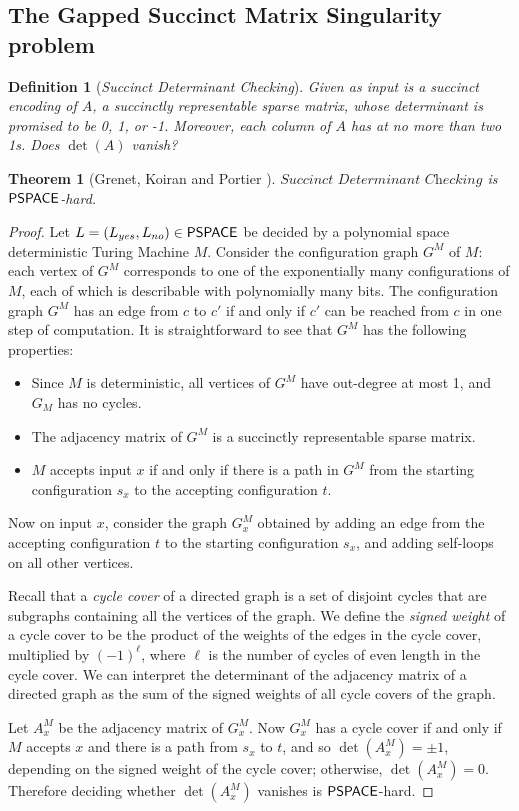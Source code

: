 \documentclass[11pt]{article}
\newtheorem{theorem}{Theorem}
\newtheorem{definition}{Definition}
\theoremstyle{definition}
\theoremstyle{remark}
\newcommand\PSPACE{{\sf{PSPACE}}}
\newcommand\succdet{\textit{Succinct Determinant Checking}}
\begin{document}
\subsection{The Gapped Succinct Matrix Singularity problem}
\begin{definition}[\succdet]
Given as input is a succinct encoding of $A$, a succinctly representable sparse matrix, whose determinant is promised to be 0, 1, or -1. Moreover, each column of $A$ has at no more than two 1s.  Does $\det(A)$ vanish?
\end{definition}
\begin{theorem}[Grenet, Koiran and Portier \cite{GKP13}]\label{thm:succdet}
$\succdet$ is $\PSPACE$-hard.
\end{theorem}
\begin{proof}
Let $L=(L_{yes},L_{no}) \in \PSPACE$ be decided by a polynomial space deterministic Turing Machine $M$. Consider the configuration graph $G^M$ of $M$: each vertex of $G^M$ corresponds to one of the exponentially many configurations of $M$, each of which is describable with polynomially many bits. The configuration graph $G^M$ has an edge from $c$ to $c'$ if and only if $c'$ can be reached from $c$ in one step of computation. It is straightforward to see that $G^M$ has the following properties:
\begin{itemize}
\item Since $M$ is deterministic, all vertices of $G^M$ have out-degree at most 1, and $G_M$ has no cycles.
\item The adjacency matrix of $G^M$ is a succinctly representable sparse matrix.
\item $M$ accepts input $x$ if and only if there is a path in $G^M$ from the starting configuration $s_x$ to the accepting configuration $t$.
\end{itemize}

Now on input $x$, consider the graph $G^M_x$ obtained by adding an edge from the accepting configuration $t$ to the starting configuration $s_x$, and adding self-loops on all other vertices. 

Recall that a {\sl cycle cover} of a directed graph is a set of disjoint cycles that are subgraphs containing all the vertices of the graph.  We define the {\sl signed weight} of a cycle cover to be the product of the weights of the edges in the cycle cover, multiplied by $(-1)^\ell$, where $\ell$ is the number of cycles of even length in the cycle cover.  We can interpret the determinant of the adjacency matrix of a directed graph as the sum of the signed weights of all cycle covers of the graph. 

Let $A^M_x$ be the adjacency matrix of $G_x^M$.  Now $G^M_x$ has a cycle cover if and only if $M$ accepts $x$ and there is a path from $s_x$ to $t$, and so $\det(A^M_x) = \pm 1$, depending on the signed weight of the cycle cover; otherwise, $\det(A^M_x) = 0$. Therefore deciding whether $\det(A^M_x)$ vanishes is $\PSPACE$-hard.	
\end{proof}
\end{document}
